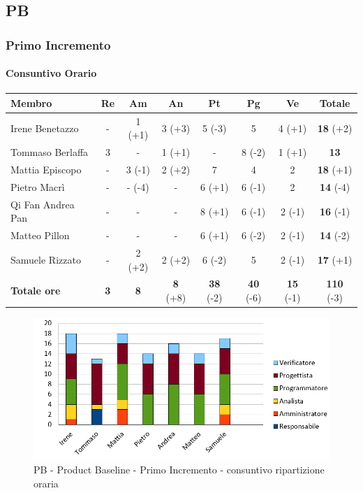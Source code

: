 
\subsection{PB}
\subsubsection{Primo Incremento}

\paragraph{Consuntivo Orario}
\begin{center}
	\renewcommand{\arraystretch}{1.8} %
	\begin{tabular}{ |m{8em}|c|c|c|c|c|c|c| }
	\hline
	\textbf{Membro} & \textbf{Re} & \textbf{Am} &  \textbf{An} &  \textbf{Pt} &  \textbf{Pg} &  \textbf{Ve} &  \textbf{Totale}\\
    \hline
    Irene Benetazzo   & - & 1 (+1)  & 3 (+3)  & 5 (-3)  & 5       & 4 (+1)  & \textbf{18} (+2) \\
    \hline
    Tommaso Berlaffa  & 3 & -       & 1 (+1)  & -       & 8 (-2)  & 1 (+1)  & \textbf{13} \\
    \hline
    Mattia Episcopo   & - & 3 (-1)  & 2 (+2)  & 7       & 4       & 2       & \textbf{18} (+1) \\
    \hline
    Pietro Macrì      & - & - (-4)  & -       & 6 (+1)  & 6 (-1)  & 2       & \textbf{14} (-4)\\
    \hline
    Qi Fan Andrea Pan & - & -       & -       & 8 (+1)  & 6 (-1)  & 2  (-1) & \textbf{16} (-1) \\
    \hline
    Matteo Pillon     & - & -       & -       & 6 (+1)  & 6 (-2)  & 2  (-1) & \textbf{14} (-2) \\
    \hline
    Samuele Rizzato   & - & 2 (+2)  & 2 (+2)  & 6 (-2)  & 5       & 2  (-1) & \textbf{17} (+1) \\
    \hline
    \textbf{Totale ore} & \textbf{3} & \textbf{8} & \textbf{8} (+8) &  \textbf{38} (-2) &  \textbf{40} (-6) &  \textbf{15} (-1) &  \textbf{110} (-3)\\
    \hline
	\end{tabular}
\end{center}
\begin{figure}[H]
    \centering\includegraphics[width=\textwidth, height=\textheight,keepaspectratio]{images/consuntivo/PB-ore.png}
    \caption{PB - Product Baseline - Primo Incremento - consuntivo ripartizione oraria}
\end{figure}

